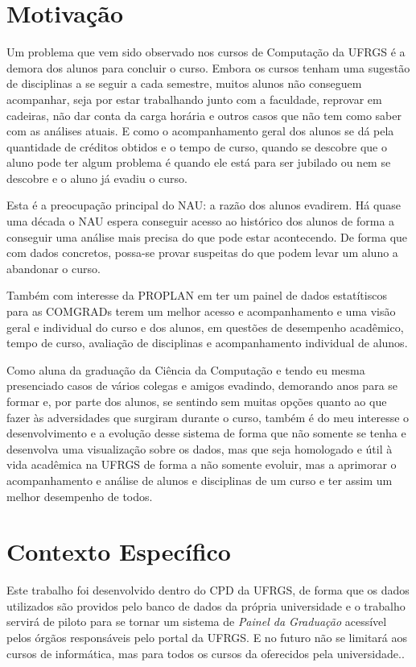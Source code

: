 \documentclass[cic,tc]{iiufrgs}
\begin{document}
\section{Motivação}\label{cap_1_1_motiv}

Um problema que vem sido observado nos cursos de Computação da UFRGS é a demora dos alunos para concluir o curso. Embora os cursos tenham uma sugestão de disciplinas a se seguir a cada semestre, muitos alunos não conseguem acompanhar, seja por estar trabalhando junto com a faculdade, reprovar em cadeiras, não dar conta da carga horária e outros casos que não tem como saber com as análises atuais. E como o acompanhamento geral dos alunos se dá pela quantidade de créditos obtidos e o tempo de curso, quando se descobre que o aluno pode ter algum problema é quando ele está para ser jubilado ou nem se descobre e o aluno já evadiu o curso. 

Esta é a preocupação principal do NAU: a razão dos alunos evadirem. Há quase uma década o NAU espera conseguir acesso ao histórico dos alunos de forma a conseguir uma análise mais precisa do que pode estar acontecendo. De forma que com dados concretos, possa-se provar suspeitas do que podem levar um aluno a abandonar o curso.

Também com interesse da PROPLAN em ter um painel de dados estatítiscos para as COMGRADs terem um melhor acesso e acompanhamento e uma visão geral e individual do curso e dos alunos, em questões de desempenho acadêmico, tempo de curso, avaliação de disciplinas e acompanhamento individual de alunos.

Como aluna da graduação da Ciência da Computação e tendo eu mesma presenciado casos de vários colegas e amigos evadindo, demorando anos para se formar e, por parte dos alunos, se sentindo sem muitas opções quanto ao que fazer às adversidades que surgiram durante o curso, também é do meu interesse o desenvolvimento e a evolução desse sistema de forma que não somente se tenha e desenvolva uma visualização sobre os dados, mas que seja homologado e útil à vida acadêmica na UFRGS de forma a não somente evoluir, mas a aprimorar o acompanhamento e análise de alunos e disciplinas de um curso e ter assim um melhor desempenho de todos.

\section{Contexto Específico}\label{cap_1_3_context}
Este trabalho foi desenvolvido dentro do CPD da UFRGS, de forma que os dados utilizados são providos pelo banco de dados da própria universidade e o trabalho servirá de piloto para se tornar um sistema de \textit{Painel da Graduação} acessível pelos órgãos responsáveis pelo portal da UFRGS. E no futuro não se limitará aos cursos de informática, mas para todos os cursos da oferecidos pela universidade..
\end{document}
